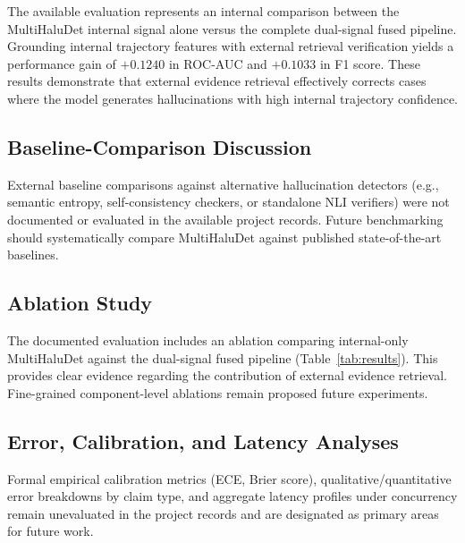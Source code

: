 \documentclass[conference]{IEEEtran}
\begin{document}
The available evaluation represents an internal comparison between the MultiHaluDet internal signal alone versus the complete dual-signal fused pipeline. Grounding internal trajectory features with external retrieval verification yields a performance gain of $+0.1240$ in ROC-AUC and $+0.1033$ in F1 score. These results demonstrate that external evidence retrieval effectively corrects cases where the model generates hallucinations with high internal trajectory confidence.

\subsection{Baseline-Comparison Discussion}
External baseline comparisons against alternative hallucination detectors (e.g., semantic entropy, self-consistency checkers, or standalone NLI verifiers) were not documented or evaluated in the available project records. Future benchmarking should systematically compare MultiHaluDet against published state-of-the-art baselines.

\subsection{Ablation Study}
The documented evaluation includes an ablation comparing internal-only MultiHaluDet against the dual-signal fused pipeline (Table~\ref{tab:results}). This provides clear evidence regarding the contribution of external evidence retrieval. Fine-grained component-level ablations remain proposed future experiments.

\subsection{Error, Calibration, and Latency Analyses}
Formal empirical calibration metrics (ECE, Brier score), qualitative/quantitative error breakdowns by claim type, and aggregate latency profiles under concurrency remain unevaluated in the project records and are designated as primary areas for future work.
\end{document}
